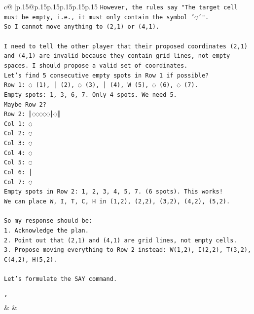 \documentclass{article}
\begin{document}
{\begin{supertabular}{c@{$\;$}|p{.15\linewidth}@{}p{.15\linewidth}p{.15\linewidth}p{.15\linewidth}p{.15\linewidth}p{.15\linewidth}}
{{{\texttt{However, the rules say "The target cell must be empty, i.e., it must only contain the symbol '◌'".} \\
\texttt{So I cannot move anything to (2,1) or (4,1).} \\
\\ 
\texttt{I need to tell the other player that their proposed coordinates (2,1) and (4,1) are invalid because they contain grid lines, not empty spaces. I should propose a valid set of coordinates.} \\
\texttt{Let's find 5 consecutive empty spots in Row 1 if possible?} \\
\texttt{Row 1: ◌ (1), │ (2), ◌ (3), │ (4), W (5), ◌ (6), ◌ (7).} \\
\texttt{Empty spots: 1, 3, 6, 7. Only 4 spots. We need 5.} \\
\texttt{Maybe Row 2?} \\
\texttt{Row 2: ║◌◌◌◌◌│◌║} \\
\texttt{Col 1: ◌} \\
\texttt{Col 2: ◌} \\
\texttt{Col 3: ◌} \\
\texttt{Col 4: ◌} \\
\texttt{Col 5: ◌} \\
\texttt{Col 6: │} \\
\texttt{Col 7: ◌} \\
\texttt{Empty spots in Row 2: 1, 2, 3, 4, 5, 7. (6 spots). This works!} \\
\texttt{We can place W, I, T, C, H in (1,2), (2,2), (3,2), (4,2), (5,2).} \\
\\ 
\texttt{So my response should be:} \\
\texttt{1. Acknowledge the plan.} \\
\texttt{2. Point out that (2,1) and (4,1) are grid lines, not empty cells.} \\
\texttt{3. Propose moving everything to Row 2 instead: W(1,2), I(2,2), T(3,2), C(4,2), H(5,2).} \\
\\ 
\texttt{Let's formulate the SAY command.} \\
\\ 
\texttt{'} \\
            }
        }
    }
    & & \\ \\


\end{supertabular}}
\end{document}
